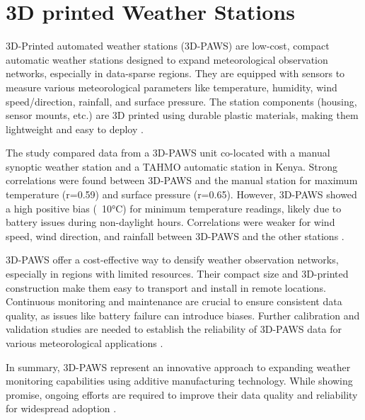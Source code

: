 \section{3D printed Weather Stations}
\label{sec:3d_printed_stations}

3D-Printed automated weather stations (3D-PAWS) are low-cost, compact automatic weather stations designed to expand meteorological observation networks, especially in data-sparse regions. They are equipped with sensors to measure various meteorological parameters like temperature, humidity, wind speed/direction, rainfall, and surface pressure. The station components (housing, sensor mounts, etc.) are 3D printed using durable plastic materials, making them lightweight and easy to deploy \cite{mwangi2017paws}.


The study compared data from a 3D-PAWS unit co-located with a manual synoptic weather station and a TAHMO automatic station in Kenya. Strong correlations were found between 3D-PAWS and the manual station for maximum temperature (r=0.59) and surface pressure (r=0.65). However, 3D-PAWS showed a high positive bias (~10°C) for minimum temperature readings, likely due to battery issues during non-daylight hours. Correlations were weaker for wind speed, wind direction, and rainfall between 3D-PAWS and the other stations \cite{mwangi2017paws}.


3D-PAWS offer a cost-effective way to densify weather observation networks, especially in regions with limited resources. Their compact size and 3D-printed construction make them easy to transport and install in remote locations. Continuous monitoring and maintenance are crucial to ensure consistent data quality, as issues like battery failure can introduce biases. Further calibration and validation studies are needed to establish the reliability of 3D-PAWS data for various meteorological applications \cite{mwangi2017paws}.

In summary, 3D-PAWS represent an innovative approach to expanding weather monitoring capabilities using additive manufacturing technology. While showing promise, ongoing efforts are required to improve their data quality and reliability for widespread adoption \cite{mwangi2017paws}.
